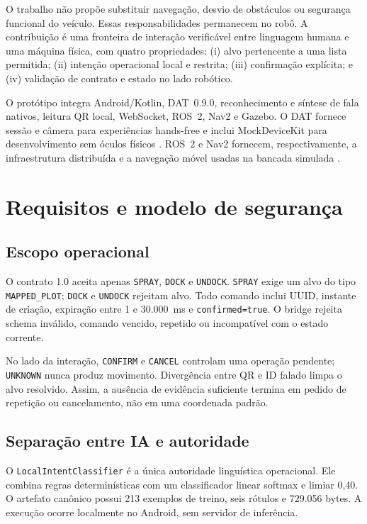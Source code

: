 \documentclass[conference]{IEEEtran}
\begin{document}
O trabalho não propõe substituir navegação, desvio de obstáculos ou segurança funcional do veículo. Essas responsabilidades permanecem no robô. A contribuição é uma fronteira de interação verificável entre linguagem humana e uma máquina física, com quatro propriedades: (i) alvo pertencente a uma lista permitida; (ii) intenção operacional local e restrita; (iii) confirmação explícita; e (iv) validação de contrato e estado no lado robótico.

O protótipo integra Android/Kotlin, DAT~0.9.0, reconhecimento e síntese de fala nativos, leitura QR local, WebSocket, ROS~2, Nav2 e Gazebo. O DAT fornece sessão e câmera para experiências hands-free e inclui MockDeviceKit para desenvolvimento sem óculos físicos \cite{meta-dat}. ROS~2 e Nav2 fornecem, respectivamente, a infraestrutura distribuída e a navegação móvel usadas na bancada simulada \cite{macenski2022ros2,macenski2020marathon2}.

\section{Requisitos e modelo de segurança}

\subsection{Escopo operacional}

O contrato 1.0 aceita apenas \texttt{SPRAY}, \texttt{DOCK} e \texttt{UNDOCK}. \texttt{SPRAY} exige um alvo do tipo \texttt{MAPPED\_PLOT}; \texttt{DOCK} e \texttt{UNDOCK} rejeitam alvo. Todo comando inclui UUID, instante de criação, expiração entre 1 e 30.000~ms e \texttt{confirmed=true}. O bridge rejeita schema inválido, comando vencido, repetido ou incompatível com o estado corrente.

No lado da interação, \texttt{CONFIRM} e \texttt{CANCEL} controlam uma operação pendente; \texttt{UNKNOWN} nunca produz movimento. Divergência entre QR e ID falado limpa o alvo resolvido. Assim, a ausência de evidência suficiente termina em pedido de repetição ou cancelamento, não em uma coordenada padrão.

\subsection{Separação entre IA e autoridade}

O \texttt{LocalIntentClassifier} é a única autoridade linguística operacional. Ele combina regras determinísticas com um classificador linear softmax e limiar 0,40. O artefato canônico possui 213 exemplos de treino, seis rótulos e 729.056 bytes. A execução ocorre localmente no Android, sem servidor de inferência.
\end{document}
